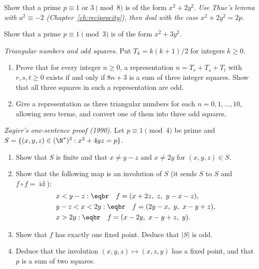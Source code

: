 \begin{exercise}[$\star\star$]\label{ex:x2y2}
Show that a prime $p\equiv1$ or $3\pmod8$ is of the form $x^2+2y^2$. \emph{Use Thue's lemma with $a^2\equiv-2$ (Chapter~\ref{ch:reciprocity}), then deal with the case $x^2+2y^2=2p$.}
\end{exercise}

\begin{exercise}[$\star\star$]\label{ex:x3y2}
Show that a prime $p\equiv1\pmod3$ is of the form $x^2+3y^2$.
\end{exercise}

\begin{exercise}[$\star\star$]\label{ex:eureka}
\emph{Triangular numbers and odd squares.} Put $T_k=k(k+1)/2$ for integers $k\ge0$.
\begin{enumerate}[label=(\alph*)]
\item Prove that for every integer $n\ge0$, a representation $n=T_r+T_s+T_t$ with $r,s,t\ge0$ exists if and only if $8n+3$ is a sum of three integer squares. Show that all three squares in such a representation are odd.
\item Give a representation as three triangular numbers for each $n=0,1,\ldots,10$, allowing zero terms, and convert one of them into three odd squares.
\end{enumerate}
\end{exercise}

\begin{exercise}[$\star\star\star$]\label{ex:zagier}
\emph{Zagier's one-sentence proof (1990).} Let $p\equiv1\pmod4$ be prime and $S=\{(x,y,z)\in(\N^*)^3:x^2+4yz=p\}$.
\begin{enumerate}[label=(\alph*)]
\item Show that $S$ is finite and that $x\ne y-z$ and $x\ne2y$ for $(x,y,z)\in S$.
\item Show that the following map is an involution of $S$ (it sends $S$ to $S$ and $f\circ f=\operatorname{id}$):
\[
\begin{aligned}&x<y-z:\eqbr\quad f=(x+2z,\ z,\ y-x-z),\\&y-z<x<2y:\eqbr\quad f=(2y-x,\ y,\ x-y+z),\\&x>2y:\eqbr\quad f=(x-2y,\ x-y+z,\ y).\end{aligned}
\]
\item Show that $f$ has exactly one fixed point. Deduce that $|S|$ is odd.
\item Deduce that the involution $(x,y,z)\mapsto(x,z,y)$ has a fixed point, and that $p$ is a sum of two squares.
\end{enumerate}
\end{exercise}

